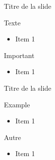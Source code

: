 \begin{frame}{Titre de la slide}
	\begin{block}{Texte}
	\begin{itemize}
	\item Item 1
	\end{itemize}
	\end{block}
	
	\begin{alertblock}{Important}
	\begin{itemize}
	\item Item 1
	\end{itemize}
	\end{alertblock}
\end{frame}

\begin{frame}{Titre de la slide}	
	\begin{exampleblock}{Example}
	\begin{itemize}
	\item Item 1
	\end{itemize}
	\end{exampleblock}
	
	\begin{block}{Autre}
	\begin{itemize}
	\item Item 1
	\end{itemize}
	\end{block}
\end{frame}
